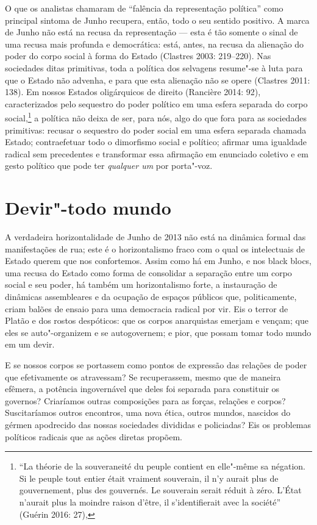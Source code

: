 O que os analistas chamaram de ``falência da representação política''
como principal sintoma de Junho recupera, então, todo o seu sentido
positivo. A marca de Junho não está na recusa da representação --- esta é
tão somente o sinal de uma recusa mais profunda e democrática: está,
antes, na recusa da alienação do poder do corpo social à forma do Estado
(Clastres 2003: 219--220). Nas sociedades ditas primitivas, toda a
política dos selvagens resume"-se à luta para que o Estado não advenha, e
para que esta alienação não se opere (Clastres 2011: 138). Em nossos
Estados oligárquicos de direito (Rancière 2014: 92), caracterizados
pelo sequestro do poder político em uma esfera separada do corpo
social,\footnote{``La théorie de la souveraneité du peuple
  contient en elle"-même sa négation. Si le peuple tout entier était
  vraiment souverain, il n'y aurait plus de gouvernement, plus des
  gouvernés. Le souverain serait réduit à zéro. L'État n'aurait plus la
  moindre raison d'être, il s'identifierait avec la société''
  (Guérin 2016: 27),} a política não deixa de ser, para nós, algo do
que fora para as sociedades primitivas: recusar o sequestro do poder
social em uma esfera separada chamada Estado; contraefetuar todo o
dimorfismo social e político; afirmar uma igualdade radical sem
precedentes e transformar essa afirmação em enunciado coletivo e em
gesto político que pode ter \emph{qualquer um} por porta"-voz.

\section{Devir"-todo mundo}

A verdadeira horizontalidade de Junho de
2013 não está na dinâmica formal das manifestações de rua; este é o
horizontalismo fraco com o qual os intelectuais de Estado querem que nos
confortemos. Assim como há em Junho, e nos black blocs, uma
recusa do Estado como forma de consolidar a separação entre um corpo
social e seu poder, há também um horizontalismo forte, a instauração de
dinâmicas assembleares e da ocupação de espaços públicos que,
politicamente, criam balões de ensaio para uma democracia radical por
vir. Eis o terror de Platão e dos rostos despóticos: que os corpos
anarquistas emerjam e vençam; que eles se auto"-organizem e se
autogovernem; e pior, que possam tomar todo mundo em um devir.

E se nossos corpos se portassem como pontos de expressão das relações de
poder que efetivamente os atravessam? Se recuperassem, mesmo que de
maneira efêmera, a potência ingovernável que deles foi separada para
constituir os governos? Criaríamos outras composições para as forças,
relações e corpos? Suscitaríamos outros encontros, uma nova ética,
outros mundos, nascidos do gérmen apodrecido das nossas sociedades
divididas e policiadas? Eis os problemas políticos radicais que as ações
diretas propõem.

